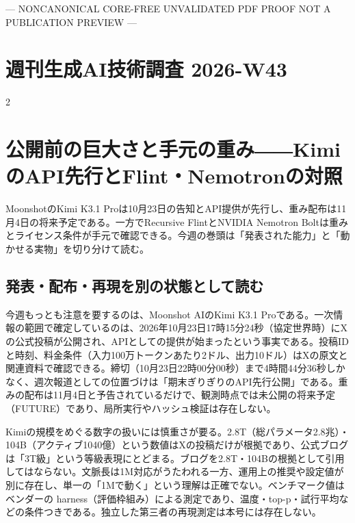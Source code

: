 \documentclass[lualatex,a4paper,10pt]{jlreq}
\begin{document}
\surveycover
{\centering\footnotesize\color{SurveyMuted}--- NONCANONICAL CORE-FREE UNVALIDATED PDF PROOF \quad NOT A PUBLICATION PREVIEW ---\par} %
\clearpage
\tableofcontents
\clearpage

\section*{週刊生成AI技術調査 2026-W43}
\label{sec:cover-title}
\begin{multicols}{2} %


\section{公開前の巨大さと手元の重み――KimiのAPI先行とFlint・Nemotronの対照}
\label{sec:P1}


MoonshotのKimi K3.1 Proは10月23日の告知とAPI提供が先行し、重み配布は11月4日の将来予定である。一方でRecursive FlintとNVIDIA Nemotron Boltは重みとライセンス条件が手元で確認できる。今週の巻頭は「発表された能力」と「動かせる実物」を切り分けて読む。


\subsection*{発表・配布・再現を別の状態として読む}


今週もっとも注意を要するのは、Moonshot AIのKimi K3.1 Proである。一次情報の範囲で確定しているのは、2026年10月23日17時15分24秒（協定世界時）にXの公式投稿が公開され、APIとしての提供が始まったという事実である。投稿IDと時刻、料金条件（入力100万トークンあたり2ドル、出力10ドル）はXの原文と関連資料で確認できる。締切（10月23日22時00分00秒）まで4時間44分36秒しかなく、週次報道としての位置づけは「期末ぎりぎりのAPI先行公開」である。重みの配布は11月4日と予告されているだけで、観測時点では未公開の将来予定（FUTURE）であり、局所実行やハッシュ検証は存在しない。


Kimiの規模をめぐる数字の扱いには慎重さが要る。2.8T（総パラメータ2.8兆）・104B（アクティブ1040億）という数値はXの投稿だけが根拠であり、公式ブログは「3T級」という等級表現にとどまる。ブログを2.8T・104Bの根拠として引用してはならない。文脈長は1M対応がうたわれる一方、運用上の推奨や設定値が別に存在し、単一の「1Mで動く」という理解は正確でない。ベンチマーク値はベンダーの harness（評価枠組み）による測定であり、温度・top-p・試行平均などの条件つきである。独立した第三者の再現測定は本号には存在しない。


\end{multicols} %
\end{document}

